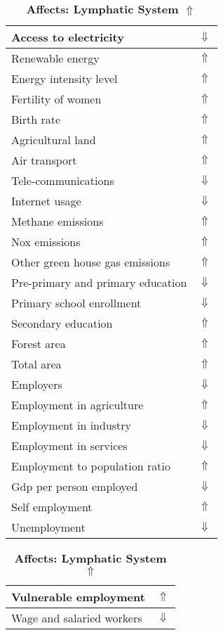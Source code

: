 \documentclass[12pt,notitlepage,oneside]{report}
\begin{document}
\clearpage
\begin{table}[!htb]
\caption{\textbf{Affects: Lymphatic System $\Uparrow$}}
\centering
\label{Correlated Socio-economic Factors0}
\begin{tabular}{|l|l|}
\hline
Access to electricity & $\Downarrow$\\ \hline
Renewable energy & $\Uparrow$\\ \hline
Energy intensity level & $\Uparrow$\\ \hline
Fertility of women & $\Uparrow$\\ \hline
Birth rate & $\Uparrow$\\ \hline
Agricultural land & $\Uparrow$\\ \hline
Air transport  & $\Uparrow$\\ \hline
Tele-communications & $\Downarrow$\\ \hline
Internet usage & $\Downarrow$\\ \hline
Methane emissions & $\Uparrow$\\ \hline
Nox emissions & $\Uparrow$\\ \hline
Other green house gas emissions & $\Uparrow$\\ \hline
Pre-primary and primary education & $\Downarrow$\\ \hline
Primary school enrollment & $\Downarrow$\\ \hline
Secondary education & $\Uparrow$\\ \hline
Forest area & $\Uparrow$\\ \hline
Total area & $\Uparrow$\\ \hline
Employers & $\Downarrow$\\ \hline
Employment in agriculture & $\Uparrow$\\ \hline
Employment in industry & $\Downarrow$\\ \hline
Employment in services & $\Downarrow$\\ \hline
Employment to population ratio & $\Uparrow$\\ \hline
Gdp per person employed & $\Downarrow$\\ \hline
Self employment & $\Uparrow$\\ \hline
Unemployment & $\Downarrow$\\ \hline
\end{tabular}
\begin{tabular}{|l|l|}
\hline
Vulnerable employment & $\Uparrow$\\ \hline
Wage and salaried workers & $\Downarrow$\\ \hline

\end{tabular}
\end{table}
\end{document}
